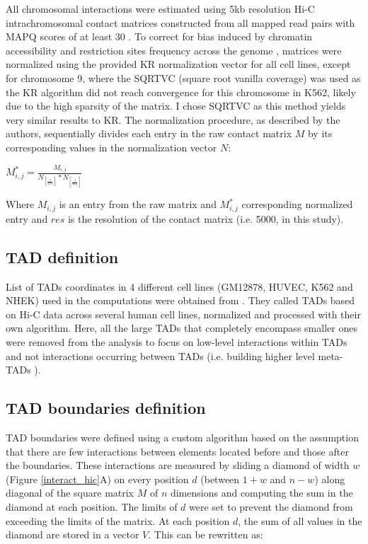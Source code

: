 \documentclass[11pt,a4paper]{report}
\begin{document}
All chromosomal interactions were estimated using 5kb resolution Hi-C intrachromosomal contact matrices constructed from all mapped read pairs with MAPQ scores of at least 30 \cite{Rao2014}. To correct for bias induced by chromatin accessibility and restriction sites frequency across the genome \cite{Rao2014}, matrices were normalized using the provided KR normalization vector for all cell lines, except for chromosome 9, where the SQRTVC (square root vanilla coverage) was used as the KR algorithm did not reach convergence for this chromosome in K562, likely due to the high sparsity of the matrix. I chose SQRTVC as this method yields very similar results to KR. 
The normalization procedure, as described by the authors, sequentially divides each entry in the raw contact matrix $M$ by its corresponding values in the normalization vector $N$:

\vspace{0.2in}
$M^*_{i,j}=\frac{M_{i,j}}{N_{[\frac{i}{res}]}*N_{[\frac{j}{res}]}}$
\vspace{0.2in}

\noindent Where $M_{i,j}$ is an entry from the raw matrix and $M^*_{i,j}$ corresponding normalized entry and $res$ is the resolution of the contact matrix (i.e. 5000, in this study).

\subsection*{TAD definition}

List of TADs coordinates in 4 different cell lines (GM12878, HUVEC, K562 and NHEK) used in the computations were obtained from \cite{Rao2014}. They called TADs based on Hi-C data across several human cell lines, normalized and processed with their own algorithm. Here, all the large TADs that completely encompass smaller ones were removed from the analysis to focus on low-level interactions within TADs and not interactions occurring between TADs (i.e. building higher level meta-TADs \cite{Fraser2015}).

\subsection*{TAD boundaries definition}

TAD boundaries were defined using a custom algorithm based on the assumption that there are few interactions between elements located before and those after the boundaries. These interactions are measured by sliding a diamond of width $w$ (Figure \ref{interact_hic}A) on every position $d$ (between $1+w$ and $n-w$) along diagonal of the square matrix $M$ of $n$ dimensions and computing the sum in the diamond at each position. The limits of $d$ were set to prevent the diamond from exceeding the limits of the matrix. At each position $d$, the sum of all values in the diamond are stored in a vector $V$. This can be rewritten as: 
\end{document}
